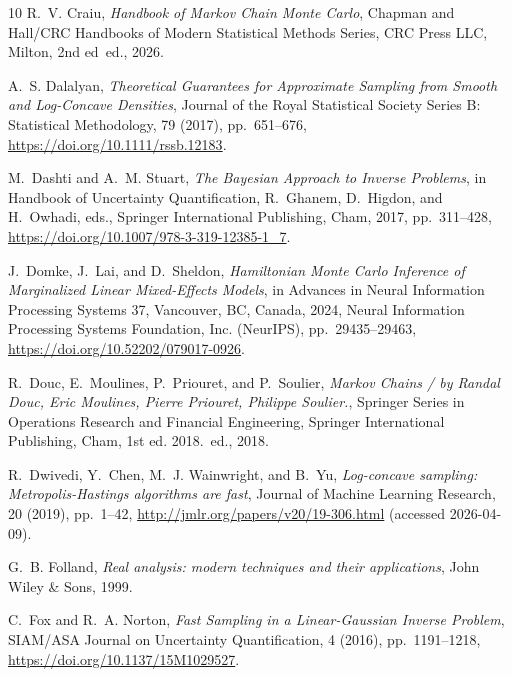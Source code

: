 \documentclass[onefignum,onetabnum]{siamonline250211}
\begin{document}
\begin{thebibliography}{10}
{\sc R.~V. Craiu}, {\em Handbook of {Markov} {Chain} {Monte} {Carlo}}, Chapman
  and {Hall}/{CRC} {Handbooks} of {Modern} {Statistical} {Methods} {Series},
  CRC Press LLC, Milton, 2nd ed~ed., 2026.

{\sc A.~S. Dalalyan}, {\em Theoretical {Guarantees} for {Approximate}
  {Sampling} from {Smooth} and {Log}-{Concave} {Densities}}, Journal of the
  Royal Statistical Society Series B: Statistical Methodology, 79 (2017),
  pp.~651--676, \url{https://doi.org/10.1111/rssb.12183}.

{\sc M.~Dashti and A.~M. Stuart}, {\em The {Bayesian} {Approach} to {Inverse}
  {Problems}}, in Handbook of {Uncertainty} {Quantification}, R.~Ghanem,
  D.~Higdon, and H.~Owhadi, eds., Springer International Publishing, Cham,
  2017, pp.~311--428, \url{https://doi.org/10.1007/978-3-319-12385-1_7}.

{\sc J.~Domke, J.~Lai, and D.~Sheldon}, {\em Hamiltonian {Monte} {Carlo}
  {Inference} of {Marginalized} {Linear} {Mixed}-{Effects} {Models}}, in
  Advances in {Neural} {Information} {Processing} {Systems} 37, Vancouver, BC,
  Canada, 2024, Neural Information Processing Systems Foundation, Inc.
  (NeurIPS), pp.~29435--29463, \url{https://doi.org/10.52202/079017-0926}.

{\sc R.~Douc, E.~Moulines, P.~Priouret, and P.~Soulier}, {\em Markov {Chains} /
  by {Randal} {Douc}, {Eric} {Moulines}, {Pierre} {Priouret}, {Philippe}
  {Soulier}.}, Springer {Series} in {Operations} {Research} and {Financial}
  {Engineering}, Springer International Publishing, Cham, 1st ed. 2018.~ed.,
  2018.

{\sc R.~Dwivedi, Y.~Chen, M.~J. Wainwright, and B.~Yu}, {\em Log-concave
  sampling: {Metropolis}-{Hastings} algorithms are fast}, Journal of Machine
  Learning Research, 20 (2019), pp.~1--42,
  \url{http://jmlr.org/papers/v20/19-306.html} (accessed 2026-04-09).

{\sc G.~B. Folland}, {\em Real analysis: modern techniques and their
  applications}, John Wiley \& Sons, 1999.

{\sc C.~Fox and R.~A. Norton}, {\em Fast {Sampling} in a {Linear}-{Gaussian}
  {Inverse} {Problem}}, SIAM/ASA Journal on Uncertainty Quantification, 4
  (2016), pp.~1191--1218, \url{https://doi.org/10.1137/15M1029527}.


\end{thebibliography}
\end{document}
